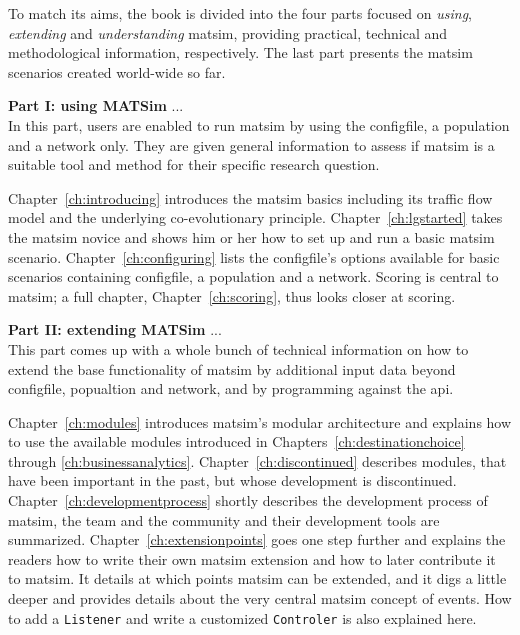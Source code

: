 To match its aims, the book is divided into the four parts focused on \emph{using}, \emph{extending} and \emph{understanding} \gls{matsim}, providing practical, technical and methodological information, respectively. The last part presents the \gls{matsim} scenarios created world-wide so far. %

\textbf{Part I: using MATSim} ... \\
In this part, users are enabled to run \gls{matsim} by using the \gls{configfile}, a population and a network only. They are given general information to assess if \gls{matsim} is a suitable tool and method for their specific research question.

Chapter~\ref{ch:introducing} introduces the \gls{matsim} basics including its traffic flow model and the underlying co-evolutionary principle. 
Chapter~\ref{ch:lgstarted} takes the \gls{matsim} novice and shows him or her how to set up and run a basic \gls{matsim} \gls{scenario}. 
Chapter~\ref{ch:configuring} lists the \gls{configfile}'s options available for basic scenarios containing \gls{configfile}, a population and a network.  
Scoring is central to \gls{matsim}; a full chapter, Chapter~\ref{ch:scoring}, thus looks closer at scoring. 

\textbf{Part II: extending MATSim} ... \\
This part comes up with a whole bunch of technical information on how to extend the base functionality of \gls{matsim} by additional input data beyond \gls{configfile}, popualtion and network, and by programming against the \gls{api}. 

Chapter~\ref{ch:modules} introduces \gls{matsim}'s modular architecture and explains how to use the available \glspl{module} introduced in Chapters~\ref{ch:destinationchoice} through \ref{ch:businessanalytics}. Chapter~\ref{ch:discontinued} describes modules, that have been important in the past, but whose development is discontinued.
Chapter~\ref{ch:developmentprocess} shortly describes the development process of \gls{matsim}, \ie the team and the community and their development tools are summarized. 
Chapter~\ref{ch:extensionpoints} goes one step further and explains the readers how to write their own \gls{matsim} \gls{extension} and how to later contribute it to \gls{matsim}. It details at which points \gls{matsim} can be extended, and it digs a little deeper and provides details about the very central \gls{matsim} concept of \glspl{event}. How to add a \lstinline|Listener| and write a customized \lstinline|Controler| is also explained here.

